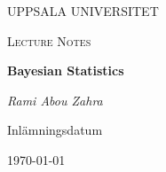 \begin{titlepage}

  \centering
	{\scshape\LARGE UPPSALA UNIVERSITET\par}
	\vspace{1cm}
  {\scshape\Large {Lecture Notes} \par}
	\vspace{1.5cm}
  {\huge\bfseries {Bayesian Statistics} \par}
	\vspace{2cm}
	{\Large\itshape Rami Abou Zahra \par}
	\vfill
  \vfill


  {\large Inlämningsdatum}\par
  {\today}

\end{titlepage}
